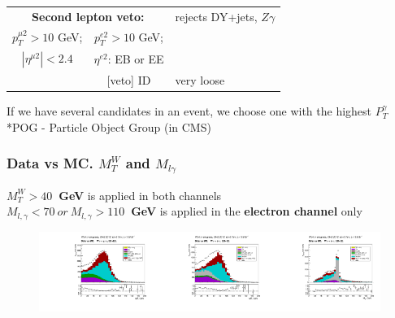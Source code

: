 \begin{frame}
\begin{table}[h]
\begin{center}
\begin{tabular}{|c|c|l|}
      \multicolumn{2}{|c|}{\scriptsize\bfseries{Second lepton veto:}} & rejects DY+jets, $Z\gamma$\\
      \tiny{$p_T^{\mu2}>10$ GeV;} &  \tiny{$p_T^{e2}>10$ GeV;} & \\
      \tiny{$|\eta^{\mu2}|<2.4$}  &   \tiny{ $\eta^{e2}$: EB or EE} &  \\
                                &   \tiny{[veto] ID} & very loose \\ \hline
      \end{tabular}
      \end{center}
  \end{table}
\scriptsize
If we have several candidates in an event, we choose one with the highest $P_T^{\gamma}$\\
*POG - Particle Object Group (in CMS)\\
\end{frame}%

\begin{frame}\frametitle{Data vs MC. $M_T^W$ and $M_{l\gamma}$}
\scriptsize
{\bfseries{$M_T^W>40$~GeV}} is applied in both channels\\
{\bfseries{$M_{l,\gamma}<70~or~M_{l,\gamma}>110$~GeV}} is applied in the {\bfseries{electron channel}} only
\begin{figure}[htb]
  \begin{center}
   \includegraphics[width=0.33\textwidth]{../figs/figs_v11/MUON_WGamma/PrepareYields/c_TotalDATAvsMC_EtaCommon__WMtVERY_PRELIMINARY.pdf}\includegraphics[width=0.33\textwidth]{../figs/figs_v11/ELECTRON_WGamma/PrepareYields/c_TotalDATAvsMC_EtaCommon__WMtVERY_PRELIMINARY.pdf}\includegraphics[width=0.33\textwidth]{../figs/figs_v11/ELECTRON_WGamma/PrepareYields/c_TotalDATAvsMC_EtaCommon__Mpholep1PRELIMINARY_FOR_E_TO_GAMMA_WITH_PSV_CUT.pdf}
  \end{center}
\end{figure}
\end{frame}

